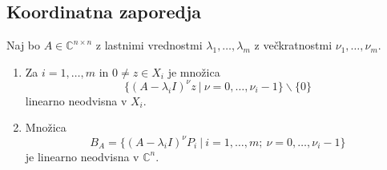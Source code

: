 \documentclass[mat1]{fmfdelo}
\newcommand{\C}{\mathbb C}
\begin{document}
\subsection{Koordinatna zaporedja}
\begin{lema}\label{lemaNeodvisnost}
    Naj bo $A \in \C^{n \times n}$ z lastnimi vrednostmi $\lambda_1, \ldots, \lambda_m$ z večkratnostmi $\nu_1, \ldots, \nu_m$.
    \begin{enumerate}
        \item Za $i = 1, \ldots, m$ in $0\neq z \in X_i$ je množica
                 \begin{equation*}
                     \{(A-\lambda_i I)^{\nu} z\ |\ \nu = 0, \ldots, \nu_i - 1\} \backslash \{0\}
                 \end{equation*}
                linearno neodvisna v $X_i$.
        \item Množica
                 \begin{equation*}
                     B_A = \{(A-\lambda_i I)^{\nu} P_i\ |\ i = 1, \ldots, m;\ \nu = 0, \ldots, \nu_i - 1\}
                 \end{equation*}
                je linearno neodvisna v $\C^n$.
    \end{enumerate}
\end{lema}
\end{document}
